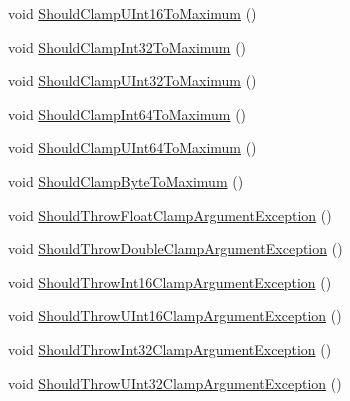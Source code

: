 \begin{DoxyCompactItemize}
void \hyperlink{class_tri_devs_1_1_tri_engine_1_1_tests_1_1_helper_tests_1_1_math_helper_tests_a1bf9a5ad5df0ed533eae22451d1693fe}{Should\-Clamp\-U\-Int16\-To\-Maximum} ()
\item 
void \hyperlink{class_tri_devs_1_1_tri_engine_1_1_tests_1_1_helper_tests_1_1_math_helper_tests_aecec135d7cf8d06d59397b46c296a7e2}{Should\-Clamp\-Int32\-To\-Maximum} ()
\item 
void \hyperlink{class_tri_devs_1_1_tri_engine_1_1_tests_1_1_helper_tests_1_1_math_helper_tests_a2b580f95ee6f26e6b69a5a5054058cdc}{Should\-Clamp\-U\-Int32\-To\-Maximum} ()
\item 
void \hyperlink{class_tri_devs_1_1_tri_engine_1_1_tests_1_1_helper_tests_1_1_math_helper_tests_ac9d4da16b292874b2a40684c7c9bb104}{Should\-Clamp\-Int64\-To\-Maximum} ()
\item 
void \hyperlink{class_tri_devs_1_1_tri_engine_1_1_tests_1_1_helper_tests_1_1_math_helper_tests_aeccafaae06d61beb8562a6cd2392163b}{Should\-Clamp\-U\-Int64\-To\-Maximum} ()
\item 
void \hyperlink{class_tri_devs_1_1_tri_engine_1_1_tests_1_1_helper_tests_1_1_math_helper_tests_af32022d5a6079b1eaed59f6f7f5fe091}{Should\-Clamp\-Byte\-To\-Maximum} ()
\item 
void \hyperlink{class_tri_devs_1_1_tri_engine_1_1_tests_1_1_helper_tests_1_1_math_helper_tests_a9b74a6a563c1032f176958c62666c655}{Should\-Throw\-Float\-Clamp\-Argument\-Exception} ()
\item 
void \hyperlink{class_tri_devs_1_1_tri_engine_1_1_tests_1_1_helper_tests_1_1_math_helper_tests_ab05fae44e4ac377468cafe2d272d8041}{Should\-Throw\-Double\-Clamp\-Argument\-Exception} ()
\item 
void \hyperlink{class_tri_devs_1_1_tri_engine_1_1_tests_1_1_helper_tests_1_1_math_helper_tests_afa75a24f3c6bf66efa6c91473c64c732}{Should\-Throw\-Int16\-Clamp\-Argument\-Exception} ()
\item 
void \hyperlink{class_tri_devs_1_1_tri_engine_1_1_tests_1_1_helper_tests_1_1_math_helper_tests_a9d62d058b0fee0f4434eb9cfedfbb75b}{Should\-Throw\-U\-Int16\-Clamp\-Argument\-Exception} ()
\item 
void \hyperlink{class_tri_devs_1_1_tri_engine_1_1_tests_1_1_helper_tests_1_1_math_helper_tests_a72a24ce8d9c40007ccf4176a3b1e3300}{Should\-Throw\-Int32\-Clamp\-Argument\-Exception} ()
\item 
void \hyperlink{class_tri_devs_1_1_tri_engine_1_1_tests_1_1_helper_tests_1_1_math_helper_tests_ad6b4feb9f84f1ebe8d63450db12a6669}{Should\-Throw\-U\-Int32\-Clamp\-Argument\-Exception} ()

\end{DoxyCompactItemize}
